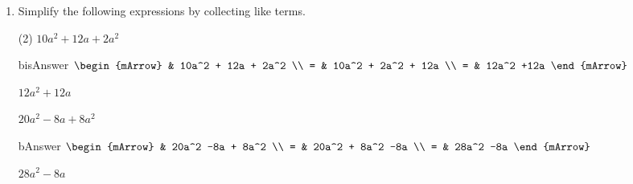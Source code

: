 \begin{enumerate}[resume]	
  \item Simplify the following expressions by collecting like terms.
  \begin{subtask}(2)
    \task[]  $ 10a^2 + 12a + 2a^2  $
              \begin{envOut}[height=6cm]{bisAnswer}
			       $\begin{mArrow}
			                & 10a^2  + 12a  + 2a^2       \\ 
                          = & 10a^2    + 2a^2  + 12a      \\ 
                          = & 12a^2  +12a  
	                \end{mArrow}$
              \end{envOut}			  
			  \begin{exercise}\begin{shortsolution}  
				       $12a^2 + 12a $
			  \end{shortsolution}\end{exercise}
			  
    \task[]  $ 20a^2  -8a  + 8a^2  $
              \begin{envOut}[height=6cm]{bAnswer}
			       $\begin{mArrow}
			                & 20a^2  -8a  + 8a^2      \\ 
                          = & 20a^2    + 8a^2  -8a    \\ 
 						  = & 28a^2	 -8a  
	                \end{mArrow}$
              \end{envOut}			  
			  \begin{exercise}\begin{shortsolution}  
				       $28a^2	 -8a$
			  \end{shortsolution}\end{exercise}			  
    \end{subtask}
\end{enumerate}



